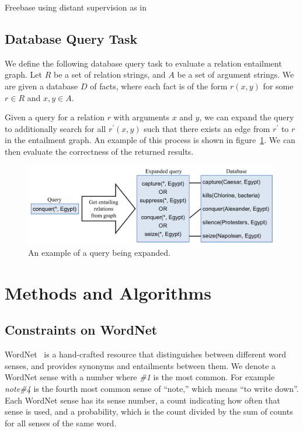 \documentclass{article}
\begin{document}
Freebase using distant supervision as in~\cite{HoffmannZLZW11}

\subsection{Database Query Task}
\label{database-query-task}
We define the following database query task to evaluate a relation entailment graph. Let $R$ be a set of relation strings, and $A$ be a set of argument strings. We are given a database $D$ of facts, where each fact is of the form $r(x, y)$ for some $r\in R$ and $x, y\in A$.

Given a query for a relation $r$ with arguments $x$ and $y$, we can expand the query to additionally search for all $r^\prime(x, y)$ such that there exists an edge from $r^\prime$ to $r$ in the entailment graph. An example of this process is shown in figure~\ref{query-expansion}. We can then evaluate the correctness of the returned results.

\begin{figure}[h]
\begin{center}
\includegraphics[width=1.0\textwidth]{figures/query-expansion.pdf}
\end{center}
\caption{An example of a query being expanded.}\label{query-expansion}
\end{figure}

\section{Methods and Algorithms}

\subsection{Constraints on WordNet}

WordNet~\cite{fellbaum98wordnet} is a hand-crafted resource that distinguishes between different word senses, and provides synonyms and entailments between them. We denote a WordNet sense with a number where \textit{\#1} is the most common. For example \textit{note\#4} is the fourth most common sense of ``note,'' which means ``to write down''. Each WordNet sense has its sense number, a count indicating how often that sense is used, and a probability, which is the count divided by the sum of counts for all senses of the same word.
\end{document}
